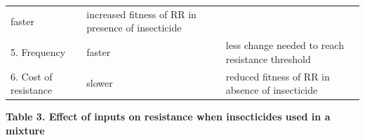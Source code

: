\documentclass[11pt,]{article}
\begin{document}
\begin{longtable}[]{@{}lll@{}}
\begin{minipage}[t]{0.10\columnwidth}
faster\strut
\end{minipage} & \begin{minipage}[t]{0.53\columnwidth}\raggedright\strut
increased fitness of RR in presence of insecticide\strut
\end{minipage}\tabularnewline
\begin{minipage}[t]{0.28\columnwidth}\raggedright\strut
5. Frequency\strut
\end{minipage} & \begin{minipage}[t]{0.10\columnwidth}\raggedright\strut
faster\strut
\end{minipage} & \begin{minipage}[t]{0.53\columnwidth}\raggedright\strut
less change needed to reach resistance threshold\strut
\end{minipage}\tabularnewline
\begin{minipage}[t]{0.28\columnwidth}\raggedright\strut
6. Cost of resistance\strut
\end{minipage} & \begin{minipage}[t]{0.10\columnwidth}\raggedright\strut
slower\strut
\end{minipage} & \begin{minipage}[t]{0.53\columnwidth}\raggedright\strut
reduced fitness of RR in absence of insecticide\strut
\end{minipage}\tabularnewline
\bottomrule
\end{longtable}

\textbf{Table 3. Effect of inputs on resistance when insecticides used
in a mixture}
\end{document}
